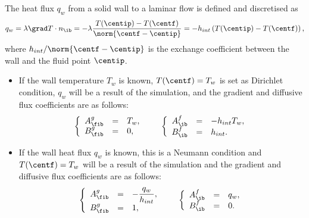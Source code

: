 \begin{example}\label{sec:bndcnd:intro}
The heat flux $q_w$ from a solid wall to a laminar flow is defined and discretised as
\begin{equation}
q_w = \lambda \grad T \cdot n_\ib = - \lambda \dfrac{T(\centip) -T(\centf)}{ \norm{\centf - \centip}} = -h_{int} \left(T(\centip) - T(\centf) \right),
\end{equation}
where $h_{int} / \norm{\centf - \centip}$ is the exchange coefficient between the wall and the fluid point $\centip$.

\begin{itemize}
\item If the wall temperature $T_w$ is known, $T(\centf) =T_w$ is set as Dirichlet condition, $q_w$
will be a result of the simulation, and the gradient and diffusive flux coefficients
are as follows:
\begin{equation}
\begin{array}{r c l}
\left\lbrace
\begin{array}{r c l}
A^g_\fib & = & T_w , \\
B^g_\fib & = & 0,
\end{array}
\right.
 & &
\left\lbrace
\begin{array}{r c l}
A^f_\ib & = & -h_{int} T_w, \\
B^f_\ib & = & h_{int}.
\end{array}
\right.
\end{array}
\end{equation}

\item If the wall heat flux $q_w$ is known, this is a Neumann condition and $T(\centf) = T_w$
will be a result of the simulation and the gradient and diffusive flux coefficients
are as follows:
\begin{equation}
\begin{array}{r c l}
\left\lbrace
\begin{array}{r c l}
A^g_\fib & = & - \dfrac{q_w}{h_{int}} ,\\
B^g_\fib & = & 1,
\end{array}
\right.
& &
\left\lbrace
\begin{array}{r c l}
A^f_\ib & = & q_w ,\\
B^f_\ib & = & 0 .
\end{array}
\right.
\end{array}
\end{equation}

\end{itemize}
\end{example}

